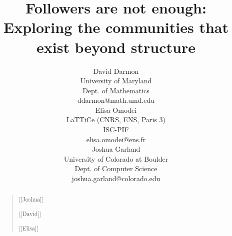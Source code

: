 \documentclass[letterpaper]{article}
\begin{document}
\title{
Followers are not enough: Exploring the communities that exist beyond structure \\
 }
  \author{David Darmon  \\
 University of Maryland\\
Dept. of Mathematics \\
ddarmon@math.umd.edu \\
 \And Elisa Omodei \\
 LaTTiCe (CNRS, ENS, Paris 3)\\
ISC-PIF\\
elisa.omodei@ens.fr \\
 \And 
 Joshua Garland\\
 University of Colorado at Boulder\\
Dept. of Computer Science \\
joshua.garland@colorado.edu}

\maketitle

\begin{abstract}
\begin{quote}
[[Joshua]]

[[David]]

[[Elisa]]

\end{quote}
\end{abstract}









\end{document}
